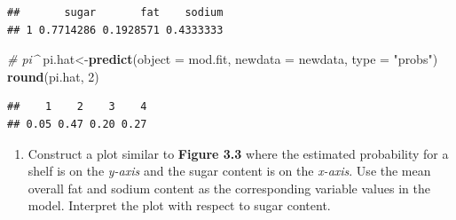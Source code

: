 \documentclass[11pt,]{article}
\newenvironment{Shaded}{\begin{snugshade}}{\end{snugshade}}
\newcommand{\KeywordTok}[1]{\textcolor[rgb]{0.13,0.29,0.53}{\textbf{#1}}}
\newcommand{\DataTypeTok}[1]{\textcolor[rgb]{0.13,0.29,0.53}{#1}}
\newcommand{\DecValTok}[1]{\textcolor[rgb]{0.00,0.00,0.81}{#1}}
\newcommand{\StringTok}[1]{\textcolor[rgb]{0.31,0.60,0.02}{#1}}
\newcommand{\CommentTok}[1]{\textcolor[rgb]{0.56,0.35,0.01}{\textit{#1}}}
\newcommand{\NormalTok}[1]{#1}
\providecommand{\tightlist}{%
  \setlength{\itemsep}{0pt}\setlength{\parskip}{0pt}}
\begin{document}
\begin{verbatim}
##       sugar       fat    sodium
## 1 0.7714286 0.1928571 0.4333333
\end{verbatim}

\begin{Shaded}
\begin{Highlighting}[]
\CommentTok{# pi^}
\NormalTok{pi.hat<-}\KeywordTok{predict}\NormalTok{(}\DataTypeTok{object =}\NormalTok{ mod.fit, }\DataTypeTok{newdata =}\NormalTok{ newdata, }\DataTypeTok{type =} \StringTok{"probs"}\NormalTok{)}
\KeywordTok{round}\NormalTok{(pi.hat, }\DecValTok{2}\NormalTok{)}
\end{Highlighting}
\end{Shaded}

\begin{verbatim}
##    1    2    3    4 
## 0.05 0.47 0.20 0.27
\end{verbatim}

\begin{enumerate}
\def\labelenumi{\alph{enumi}.}
\setcounter{enumi}{6}
\tightlist
\item
  Construct a plot similar to \textbf{Figure 3.3} where the estimated
  probability for a shelf is on the \emph{y-axis} and the sugar content
  is on the \emph{x-axis}. Use the mean overall fat and sodium content
  as the corresponding variable values in the model. Interpret the plot
  with respect to sugar content.
\end{enumerate}
\end{document}
